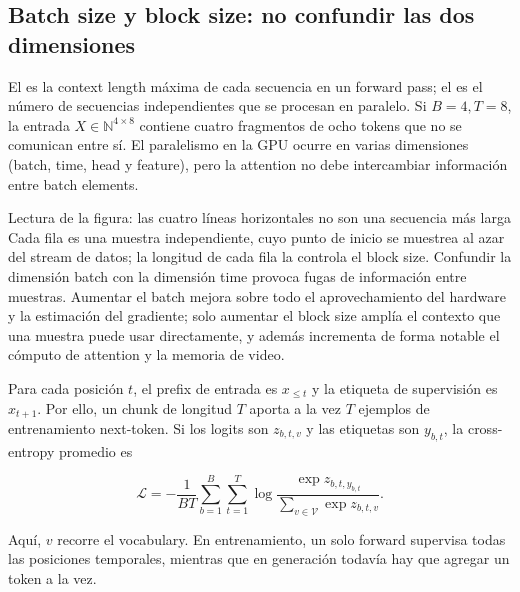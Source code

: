 \subsection{Batch size y block size: no confundir las dos dimensiones}

El  es la context length máxima de cada secuencia en un forward pass; el  es el número de secuencias independientes que se procesan en paralelo. Si $B=4,T=8$, la entrada $X\in\mathbb N^{4\times8}$ contiene cuatro fragmentos de ocho tokens que no se comunican entre sí. El paralelismo en la GPU ocurre en varias dimensiones (batch, time, head y feature), pero la attention no debe intercambiar información entre batch elements.


\begin{knowledgebox}{Lectura de la figura: las cuatro líneas horizontales no son una secuencia más larga}
Cada fila es una muestra independiente, cuyo punto de inicio se muestrea al azar del stream de datos; la longitud de cada fila la controla el block size. Confundir la dimensión batch con la dimensión time provoca fugas de información entre muestras. Aumentar el batch mejora sobre todo el aprovechamiento del hardware y la estimación del gradiente; solo aumentar el block size amplía el contexto que una muestra puede usar directamente, y además incrementa de forma notable el cómputo de attention y la memoria de video.
\end{knowledgebox}


Para cada posición $t$, el prefix de entrada es $x_{\le t}$ y la etiqueta de supervisión es $x_{t+1}$. Por ello, un chunk de longitud $T$ aporta a la vez $T$ ejemplos de entrenamiento next-token. Si los logits son $z_{b,t,v}$ y las etiquetas son $y_{b,t}$, la cross-entropy promedio es

\[
\mathcal L=-\frac{1}{BT}\sum_{b=1}^{B}\sum_{t=1}^{T}
\log\frac{\exp z_{b,t,y_{b,t}}}{\sum_{v\in\mathcal V}\exp z_{b,t,v}}.
\]

Aquí, $v$ recorre el vocabulary. En entrenamiento, un solo forward supervisa todas las posiciones temporales, mientras que en generación todavía hay que agregar un token a la vez.

